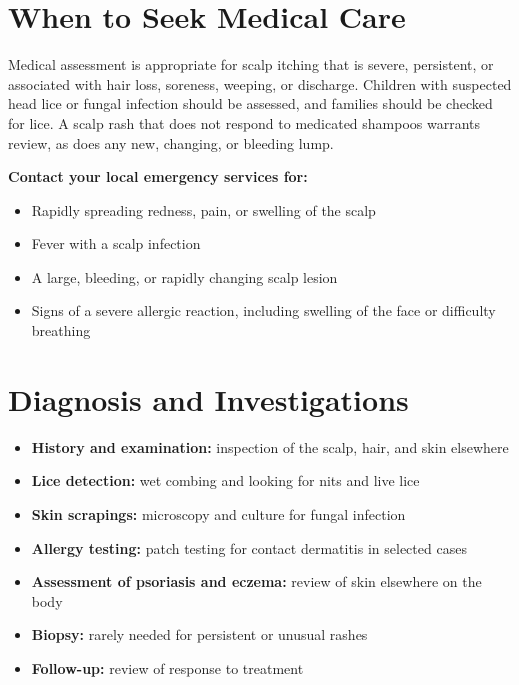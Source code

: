 \section*{When to Seek Medical Care}
Medical assessment is appropriate for scalp itching that is severe, persistent, or associated with hair loss, soreness, weeping, or discharge. Children with suspected head lice or fungal infection should be assessed, and families should be checked for lice. A scalp rash that does not respond to medicated shampoos warrants review, as does any new, changing, or bleeding lump.

\textbf{Contact your local emergency services for:}
\begin{itemize}
    \item Rapidly spreading redness, pain, or swelling of the scalp
    \item Fever with a scalp infection
    \item A large, bleeding, or rapidly changing scalp lesion
    \item Signs of a severe allergic reaction, including swelling of the face or difficulty breathing
\end{itemize}

\section*{Diagnosis and Investigations}
\begin{itemize}
    \item \textbf{History and examination:} inspection of the scalp, hair, and skin elsewhere
    \item \textbf{Lice detection:} wet combing and looking for nits and live lice
    \item \textbf{Skin scrapings:} microscopy and culture for fungal infection
    \item \textbf{Allergy testing:} patch testing for contact dermatitis in selected cases
    \item \textbf{Assessment of psoriasis and eczema:} review of skin elsewhere on the body
    \item \textbf{Biopsy:} rarely needed for persistent or unusual rashes
    \item \textbf{Follow-up:} review of response to treatment
\end{itemize}

